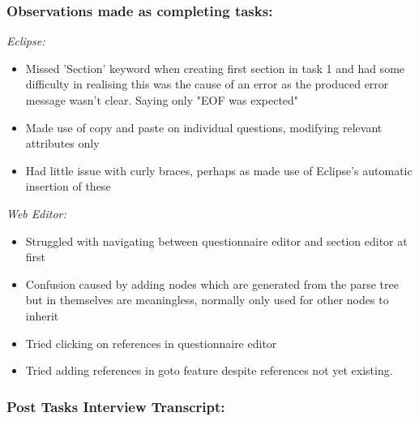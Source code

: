 \documentclass{report}
\begin{document}
\subsubsection*{Observations made as completing tasks:}

\emph{Eclipse:}
\begin{itemize}
\item Missed 'Section' keyword when creating first section in task 1 and had some difficulty in realising this was the cause of an error as the produced error message wasn't clear. Saying only "EOF was expected"
\item Made use of copy and paste on individual questions, modifying relevant attributes only
\item Had little issue with curly braces, perhaps as made use of Eclipse's automatic insertion of these
\end{itemize}
\emph{Web Editor:}
\begin{itemize}
\item Struggled with navigating between questionnaire editor and section editor at first
\item Confusion caused by adding nodes which are generated from the parse tree but in themselves are meaningless, normally only used for other nodes to inherit
\item Tried clicking on references in questionnaire editor
\item Tried adding references in goto feature despite references not yet existing.
\end{itemize}

\subsubsection*{Post Tasks Interview Transcript:}
\end{document}
